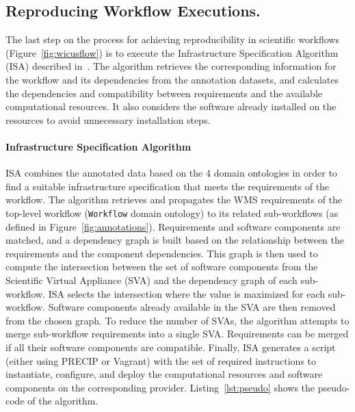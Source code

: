 \subsection{Reproducing Workflow Executions.}

The last step on the process for achieving reproducibility in scientific workflows 
(Figure~\ref{fig:wicusflow}) is to execute the Infrastructure Specification Algorithm 
(ISA) described in~\cite{wicus}. The algorithm retrieves the corresponding information for the 
workflow and its dependencies from the annotation datasets, and calculates the 
dependencies and compatibility between requirements and the available 
computational resources. It also considers the software already installed on the
resources to avoid unnecessary installation steps.

\paragraph{\textbf{Infrastructure Specification Algorithm}}
ISA combines the annotated data based on the 4 
domain ontologies in order to find a suitable infrastructure specification that meets 
the requirements of the workflow. The algorithm retrieves and propagates the WMS 
requirements of the top-level workflow (\texttt{Workflow} domain ontology) to its 
related sub-workflows (as defined in Figure~\ref{fig:annotations}). Requirements 
and software components are matched, and a dependency graph is built based 
on the relationship between the requirements and the component dependencies. This 
graph is then used to compute the intersection between the set of software components 
from the Scientific Virtual Appliance (SVA) and the dependency graph of each sub-workflow. ISA selects the 
intersection where the value is maximized for each sub-workflow. Software components 
already available in the SVA are then removed from the chosen graph. To reduce 
the number of SVAs, the algorithm attempts to merge sub-workflow requirements 
into a single SVA. Requirements can be merged if all their software components are 
compatible. Finally, ISA generates a script (either using PRECIP or Vagrant) with 
the set of required instructions to instantiate, configure, and deploy the computational 
resources and software components on the corresponding provider. Listing~\ref{lst:pseudo}
shows the pseudo-code of the algorithm.
          

